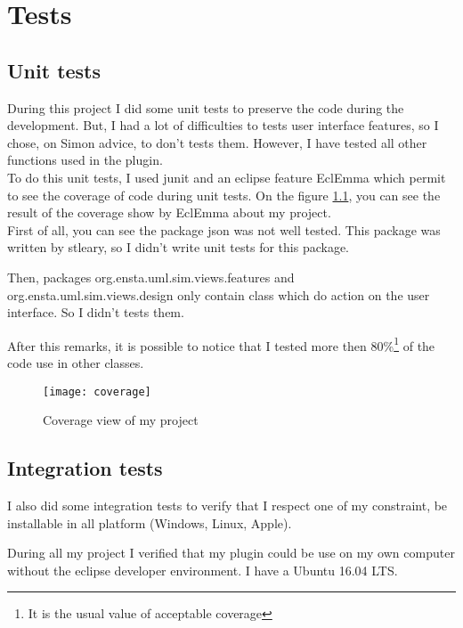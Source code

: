 
\chapter{Tests}
\label{chap:test}

\section{Unit tests}

During this project I did some unit tests to preserve the code during the development. But, I had a lot of difficulties to tests user interface features, so I chose, on Simon advice, to don't tests them. However, I have tested all other functions used in the plugin.
~\\

To do this unit tests, I used junit and an eclipse feature EclEmma which permit to see the coverage of code during unit tests. On the figure \ref{fig:coverage}, you can see the result of the coverage show by EclEmma about my project.
~\\

First of all, you can see the package json was not well tested. This package was written by stleary\cite{json}, so I didn't write unit tests for this package.

Then, packages org.ensta.uml.sim.views.features and org.ensta.uml.sim.views.design only contain class which do action on the user interface. So I didn't tests them.

After this remarks, it is possible to notice that I tested more then 80\%\footnote{It is the usual value of acceptable coverage} of the code use in other classes.


\begin{figure}[h]
  \centering
  \texttt{[image: coverage]}
  \caption{Coverage view of my project}
  \label{fig:coverage}
\end{figure}

\section{Integration tests}

I also did some integration tests to verify that I respect one of my constraint, be installable  in all platform (Windows, Linux, Apple).

During all my project I verified that my plugin could be use on my own computer without the eclipse developer environment. I have a Ubuntu 16.04 LTS.

